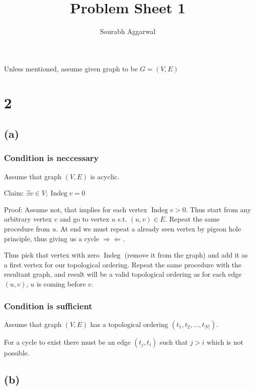 \documentclass[12pt,3p]{elsarticle}
\newcommand{\contradiction}{
  \Rightarrow\!\Leftarrow
}
\begin{document}
\begin{frontmatter}

\title{ Problem Sheet 1 }

\author{Sourabh Aggarwal}
\address{111601025@smail.iitpkd.ac.in}

\end{frontmatter}

Unless mentioned, assume given graph to be $G = (V, E)$

\section{2}

\subsection{(a)}

\subsubsection{Condition is neccessary}
Assume that graph $(V, E)$ is acyclic. 

Claim: $\exists v \in V; \operatorname{Indeg} v = 0$

Proof: Assume not, that implies for each vertex $\operatorname{Indeg} v > 0$. Thus start from any arbitrary vertex $v$ and go to vertex $u$ s.t. $(u, v) \in E$. Repeat the same procedure from $u$. At end we must repeat a already seen vertex by pigeon hole principle, thus giving us a cycle $\contradiction$.

Thus pick that vertex with zero $\operatorname{Indeg}$ (remove it from the graph) and add it as a first vertex for our topological ordering. Repeat the same procedure with the resultant graph, and result will be a valid topological ordering as for each edge $(u, v)$, $u$ is coming before $v$.

\subsubsection{Condition is sufficient}

Assume that graph $(V, E)$ has a topological ordering $(t_1, t_2, \dots, t_{|V|})$.

For a cycle to exist there must be an edge $(t_j, t_i)$ such that $j > i$ which is not possible.

\subsection{(b)}
\end{document}
